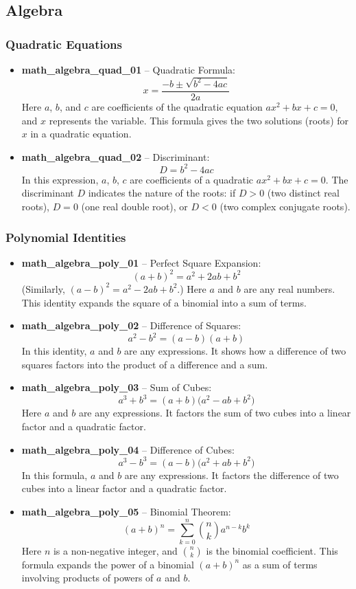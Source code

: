 \documentclass[11pt,a4paper]{article}
\begin{document}
\subsection{Algebra}

\subsubsection{Quadratic Equations}

\begin{itemize}
\item \textbf{math\_algebra\_quad\_01} -- Quadratic Formula: 
\[x = \frac{-b \pm \sqrt{b^2 - 4ac}}{2a}\]
Here $a$, $b$, and $c$ are coefficients of the quadratic equation $ax^2 + bx + c = 0$, and $x$ represents the variable. This formula gives the two solutions (roots) for $x$ in a quadratic equation.

\item \textbf{math\_algebra\_quad\_02} -- Discriminant: 
\[D = b^2 - 4ac\]
In this expression, $a$, $b$, $c$ are coefficients of a quadratic $ax^2+bx+c=0$. The discriminant $D$ indicates the nature of the roots: if $D>0$ (two distinct real roots), $D=0$ (one real double root), or $D<0$ (two complex conjugate roots).
\end{itemize}

\subsubsection{Polynomial Identities}

\begin{itemize}
\item \textbf{math\_algebra\_poly\_01} -- Perfect Square Expansion: 
\[(a + b)^2 = a^2 + 2ab + b^2\]
(Similarly, $(a - b)^2 = a^2 - 2ab + b^2$.) Here $a$ and $b$ are any real numbers. This identity expands the square of a binomial into a sum of terms.

\item \textbf{math\_algebra\_poly\_02} -- Difference of Squares: 
\[a^2 - b^2 = (a - b)(a + b)\]
In this identity, $a$ and $b$ are any expressions. It shows how a difference of two squares factors into the product of a difference and a sum.

\item \textbf{math\_algebra\_poly\_03} -- Sum of Cubes: 
\[a^3 + b^3 = (a + b)\big(a^2 - ab + b^2\big)\]
Here $a$ and $b$ are any expressions. It factors the sum of two cubes into a linear factor and a quadratic factor.

\item \textbf{math\_algebra\_poly\_04} -- Difference of Cubes: 
\[a^3 - b^3 = (a - b)\big(a^2 + ab + b^2\big)\]
In this formula, $a$ and $b$ are any expressions. It factors the difference of two cubes into a linear factor and a quadratic factor.

\item \textbf{math\_algebra\_poly\_05} -- Binomial Theorem: 
\[(a + b)^n = \sum_{k=0}^{n}\binom{n}{k} a^{n-k}b^k\]
Here $n$ is a non-negative integer, and $\binom{n}{k}$ is the binomial coefficient. This formula expands the power of a binomial $(a+b)^n$ as a sum of terms involving products of powers of $a$ and $b$.
\end{itemize}
\end{document}
